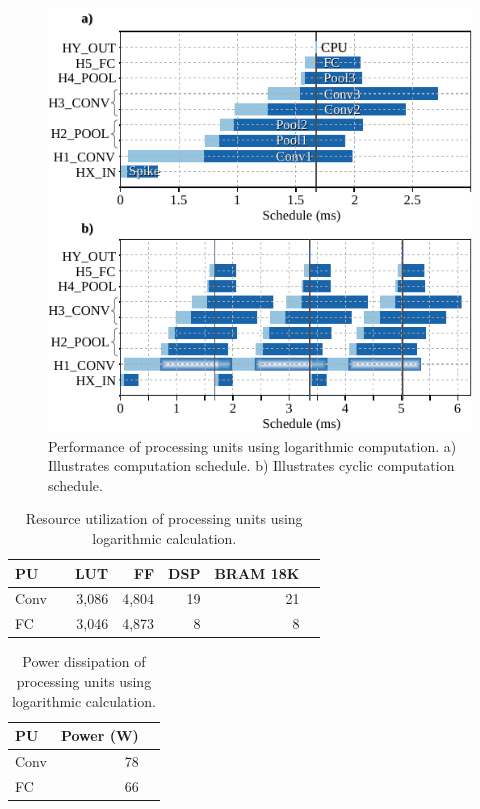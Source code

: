 \begin{figure}[!t]
	\centering
	\includegraphics[width=1\columnwidth]{../figures/latency_log_cycle.pdf}
	\caption{Performance of processing units using logarithmic computation. a) Illustrates computation schedule. b) Illustrates cyclic computation schedule.}
	\label{fig:latency_pu_log_cycle}
\end{figure}

\begin{table}[!h]\centering
	\caption{Resource utilization of processing units using logarithmic calculation.}\label{tab:resource_log}
	\scriptsize
	\begin{tabular}{lrrrrrr}\toprule
		\textbf{PU} & &\textbf{LUT} &\textbf{FF} &\textbf{DSP} &\textbf{BRAM 18K} \\\midrule
		Conv & &3,086 &4,804 &19 &21 \\
		FC & &3,046 &4,873 &8 &8 \\
		\bottomrule
	\end{tabular}
\end{table}

\begin{table}[!h]\centering
	\caption{Power dissipation of processing units using logarithmic calculation.}\label{tab:power_log}
	\scriptsize
	\begin{tabular}{lrr}\toprule
		\textbf{PU} &\textbf{Power (W)} \\\midrule
		Conv &78 \\
		FC &66 \\
		\bottomrule
	\end{tabular}
\end{table}

